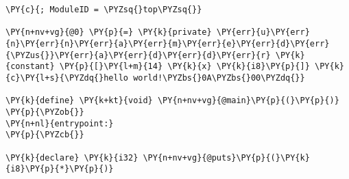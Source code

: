 \begin{Verbatim}[commandchars=\\\{\}]
\PY{c}{; ModuleID = \PYZsq{}top\PYZsq{}}

\PY{n+nv+vg}{@0} \PY{p}{=} \PY{k}{private} \PY{err}{u}\PY{err}{n}\PY{err}{n}\PY{err}{a}\PY{err}{m}\PY{err}{e}\PY{err}{d}\PY{err}{\PYZus{}}\PY{err}{a}\PY{err}{d}\PY{err}{d}\PY{err}{r} \PY{k}{constant} \PY{p}{[}\PY{l+m}{14} \PY{k}{x} \PY{k}{i8}\PY{p}{]} \PY{k}{c}\PY{l+s}{\PYZdq{}hello world!\PYZbs{}0A\PYZbs{}00\PYZdq{}}

\PY{k}{define} \PY{k+kt}{void} \PY{n+nv+vg}{@main}\PY{p}{(}\PY{p}{)} \PY{p}{\PYZob{}}
\PY{n+nl}{entrypoint:}
\PY{p}{\PYZcb{}}

\PY{k}{declare} \PY{k}{i32} \PY{n+nv+vg}{@puts}\PY{p}{(}\PY{k}{i8}\PY{p}{*}\PY{p}{)}
\end{Verbatim}
